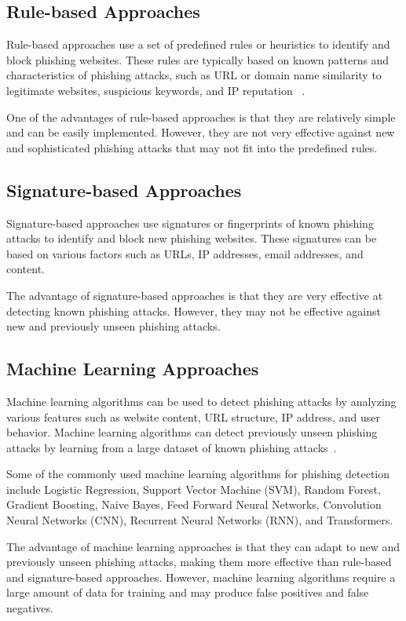 \documentclass[final]{cvpr}
\begin{document}
\subsection{Rule-based Approaches}
Rule-based approaches use a set of predefined rules or heuristics to identify and block phishing websites. These rules are typically based on known patterns and characteristics of phishing attacks, such as URL or domain name similarity to legitimate websites, suspicious keywords, and IP reputation ~\cite{phishing-detection1}.

One of the advantages of rule-based approaches is that they are relatively simple and can be easily implemented. However, they are not very effective against new and sophisticated phishing attacks that may not fit into the predefined rules.

\subsection{Signature-based Approaches}
Signature-based approaches use signatures or fingerprints of known phishing attacks to identify and block new phishing websites. These signatures can be based on various factors such as URLs, IP addresses, email addresses, and content.

The advantage of signature-based approaches is that they are very effective at detecting known phishing attacks. However, they may not be effective against new and previously unseen phishing attacks.

\subsection{Machine Learning Approaches}
Machine learning algorithms can be used to detect phishing attacks by analyzing various features such as website content, URL structure, IP address, and user behavior. Machine learning algorithms can detect previously unseen phishing attacks by learning from a large dataset of known phishing attacks~\cite{shahrivari2020phishing}.

Some of the commonly used machine learning algorithms for phishing detection include Logistic Regression, Support Vector Machine (SVM), Random Forest, Gradient Boosting, Naive Bayes, Feed Forward Neural Networks, Convolution Neural Networks (CNN), Recurrent Neural Networks (RNN), and Transformers.

The advantage of machine learning approaches is that they can adapt to new and previously unseen phishing attacks, making them more effective than rule-based and signature-based approaches. However, machine learning algorithms require a large amount of data for training and may produce false positives and false negatives.
\end{document}
